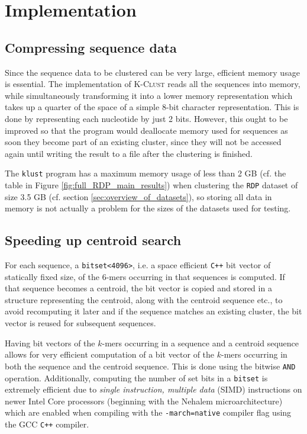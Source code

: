 \section{Implementation} \label{sec:implementation}

\subsection{Compressing sequence data}

Since the sequence data to be clustered can be very large, efficient memory
usage is essential. The implementation of \textsc{K-Clust} reads all the
sequences into memory, while simultaneously transforming it into a lower memory
representation which takes up a quarter of the space of a simple 8-bit
character representation. This is done by representing each nucleotide by just
2 bits. However, this ought to be improved so that the program would deallocate
memory used for sequences as soon they become part of an existing cluster,
since they will not be accessed again until writing the result to a file after
the clustering is finished.

The \texttt{klust} program has a maximum memory usage of less than 2 GB (cf.
the table in Figure \ref{fig:full_RDP_main_results}) when clustering the
\texttt{RDP} dataset of size 3.5 GB (cf. section
\ref{sec:overview_of_datasets}), so storing all data in memory is not actually
a problem for the sizes of the datasets used for testing.


\subsection{Speeding up centroid search}

For each sequence, a \verb|bitset<4096>|, i.e. a space efficient \texttt{C++}
bit vector of statically fixed size, of the $6$-mers occurring in that
sequences is computed. If that sequence becomes a centroid, the bit vector is
copied and stored in a structure representing the centroid, along with the
centroid sequence etc., to avoid recomputing it later and if the sequence
matches an existing cluster, the bit vector is reused for subsequent sequences.

Having bit vectors of the $k$-mers occurring in a sequence and a centroid
sequence allows for very efficient computation of a bit vector of the $k$-mers
occurring in both the sequence and the centroid sequence. This is done using
the bitwise \verb|AND| operation. Additionally, computing the number of set
bits in a \verb|bitset| is extremely efficient due to \emph{single instruction,
multiple data} (SIMD) instructions on newer Intel Core processors (beginning
with the Nehalem microarchitecture) which are enabled when compiling with the
\verb|-march=native| compiler flag using the GCC \texttt{C++} compiler.


